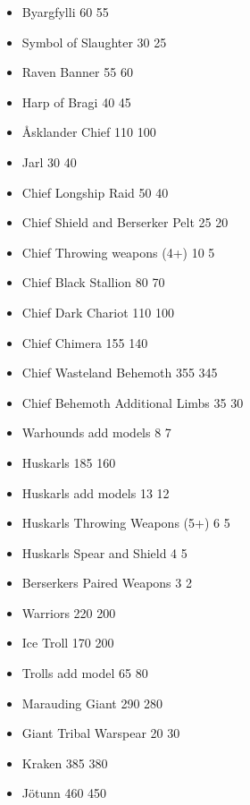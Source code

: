 \begin{itemize}
	\item Byargfylli 60 \costdown{} 55
	\item Symbol of Slaughter 30 \costdown{} 25
	\item Raven Banner 55 \costup{} 60
	\item Harp of Bragi 40 \costup{} 45
	\item Åsklander Chief 110 \costdown{} 100
	\item Jarl 30 \costup{} 40
	\item Chief Longship Raid 50 \costdown{} 40
	\item Chief Shield and Berserker Pelt 25 \costdown{} 20
	\item Chief Throwing weapons (4+) 10 \costdown{} 5
	\item Chief Black Stallion 80 \costdown{} 70
	\item Chief Dark Chariot 110 \costdown{} 100
	\item Chief Chimera 155 \costdown{} 140
	\item Chief Wasteland Behemoth 355 \costdown{} 345
	\item Chief Behemoth Additional Limbs 35 \costdown{} 30
	\item Warhounds add models 8 \costdown{} 7
	\item Huskarls 185 \costdown{} 160
	\item Huskarls add models 13 \costdown{} 12
	\item Huskarls Throwing Weapons (5+) 6 \costdown{} 5
	\item Huskarls Spear and Shield 4 \costup{} 5
	\item Berserkers Paired Weapons 3 \costdown{} 2
	\item Warriors 220 \costdown{} 200
	\item Ice Troll 170 \costup{} 200
	\item Trolls add model 65 \costup{} 80
	\item Marauding Giant 290 \costdown{} 280
	\item Giant Tribal Warspear 20 \costdown{} 30
	\item Kraken 385 \costdown{} 380
	\item Jötunn 460 \costdown{} 450 
\end{itemize}

